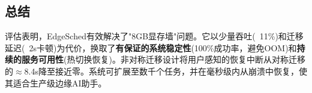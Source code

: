 \subsection{总结}

评估表明，EdgeSched有效解决了"8GB显存墙"问题。它以少量吞吐(~11\%)和迁移延迟(~2s卡顿)为代价，换取了\textbf{有保证的系统稳定性}(100\%成功率，避免OOM)和\textbf{持续的服务可用性}(热切换恢复)。非对称迁移设计将用户感知的恢复中断从对称迁移的$\approx$8.4s降至接近零。系统可扩展至数千个任务，并在毫秒级内从崩溃中恢复，使其适合生产级边缘AI助手。
